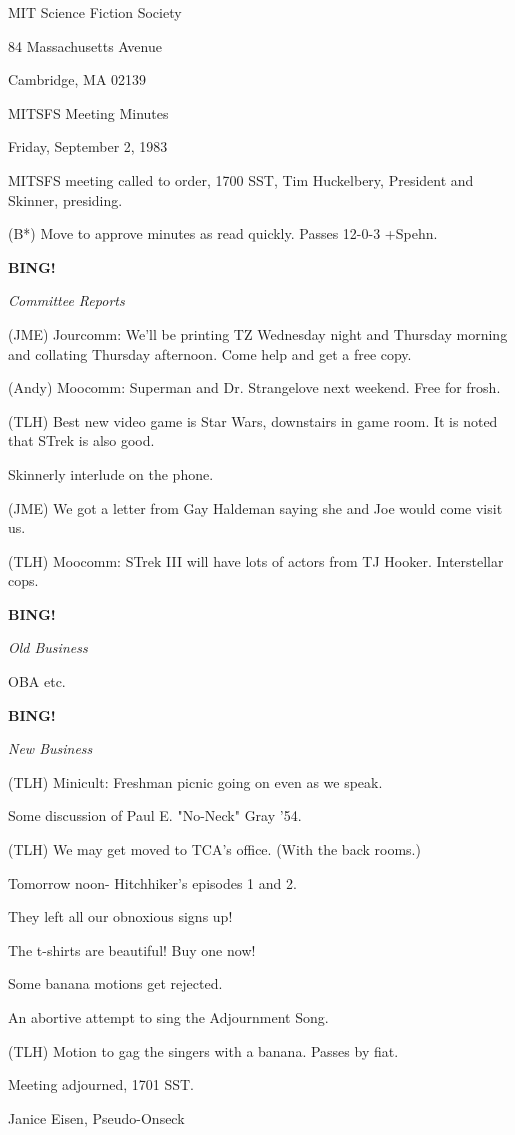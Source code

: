 \documentclass[12pt]{article}
\newcommand{\bing}{{\bf BING!} }
\newcommand{\goto}[1]{\bing \vskip 12pt \centerline{{\em{#1}}}}
\begin{document}
\begin{center}

MIT Science Fiction Society 

84 Massachusetts Avenue

Cambridge, MA 02139

\vspace{12pt}

MITSFS Meeting Minutes 

Friday, September 2, 1983

\end{center}
 
\vspace{18pt}

\setlength{\parskip}{6pt}

\noindent
MITSFS meeting called to order, 1700 SST,
Tim Huckelbery, President and Skinner, presiding.

(B*) Move to approve minutes as read quickly. Passes 12-0-3 +Spehn.

\goto{Committee Reports}

(JME) Jourcomm: We'll be printing TZ Wednesday night and Thursday morning and collating Thursday afternoon. Come help and get a free copy.

(Andy) Moocomm: Superman and Dr. Strangelove next weekend. Free for frosh.

(TLH) Best new video game is Star Wars, downstairs in game room. It is noted that STrek is also good.

Skinnerly interlude on the phone.

(JME) We got a letter from Gay Haldeman saying she and Joe would come visit us.

(TLH) Moocomm: STrek III will have lots of actors from TJ Hooker. Interstellar cops.

\goto{Old Business}

OBA etc.

\goto{New Business}

(TLH) Minicult: Freshman picnic going on even as we speak.

Some discussion of Paul E. "No-Neck" Gray '54.

(TLH) We may get moved to TCA's office. (With the back rooms.)

Tomorrow noon- Hitchhiker's episodes 1 and 2.

They left all our obnoxious signs up!

The t-shirts are beautiful! Buy one now!

Some banana motions get rejected.

An abortive attempt to sing the Adjournment Song.

(TLH) Motion to gag the singers with a banana. Passes by fiat.

\vspace{12pt}

\noindent
Meeting adjourned, 1701 SST.

\vspace{18pt}

\centerline{Janice Eisen, Pseudo-Onseck}
\end{document}
